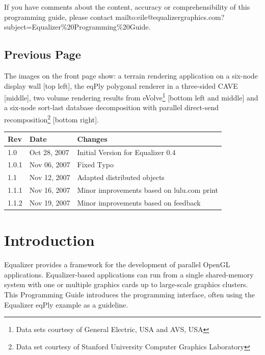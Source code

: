 \documentclass[10pt,a4]{scrartcl}
\begin{document}
If you have comments about the content, accuracy or comprehensibility of
this programming guide, please contact
{mailto:eile@equalizergraphics.com?subject=Equalizer\%20Programming\%20Guide}.

\vfill

\subsection*{Previous Page}

The images on the front page show: a terrain rendering application on a
six-node display wall [top left], the \textsf{eqPly} polygonal renderer
in a three-sided CAVE [middle], two volume rendering results from
eVolve\footnote{Data sets courtesy of General Electric, USA and AVS,
  USA} [bottom left and middle] and a six-node sort-last database
decomposition with parallel direct-send recomposition\footnote{Data set
  courtesy of Stanford University Computer Graphics Laboratory} [bottom
right].

\clearpage
\thispagestyle{empty}
\tableofcontents
\vfill{\center\begin{tabularx}{\textwidth}{|l|l|X|}
    \hline
    \bf Rev & \bf Date     & \bf Changes \\
    \hline
    1.0     & Oct 28, 2007 & Initial Version for Equalizer 0.4\\
    1.0.1   & Nov 06, 2007 & Fixed Typo\\
    1.1     & Nov 12, 2007 & Adapted distributed objects\\
    1.1.1   & Nov 16, 2007 & Minor improvements based on lulu.com print\\
    1.1.2   & Nov 19, 2007 & Minor improvements based on feedback\\
    \hline
  \end{tabularx}}
\thispagestyle{empty}
\clearpage


\section{Introduction}

Equalizer provides a framework for the development of parallel OpenGL
applications. Equalizer-based applications can run from a single
shared-memory system with one or multiple graphics cards up to
large-scale graphics clusters. This Programming Guide introduces the
programming interface, often using the Equalizer \textsf{eqPly} example
as a guideline.
\end{document}
